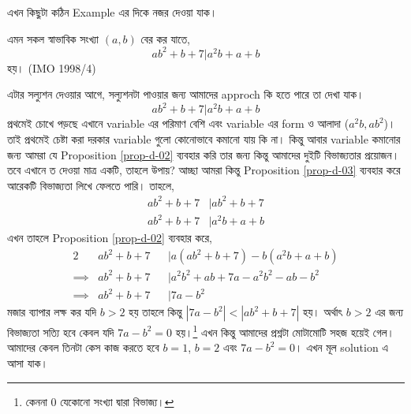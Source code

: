 \documentclass[a4paper,11pt]{article}
\begin{document}
এখন কিছুটা কঠিন Example এর দিকে নজর দেওয়া যাক। 
\begin{xmpl}
	এমন সকল স্বাভাবিক সংখ্যা $(a,b)$ বের কর যাতে,
	\[ab^2+b+7 | a^2b+a+b\]
	হয়। (IMO 1998/4)
\end{xmpl}
এটার সল্যুশন দেওয়ার আগে, সল্যুশনটা পাওয়ার জন্য আমাদের approch কি হতে পারে তা দেখা যাক।
\[ab^2+b+7 | a^2b+a+b\]
প্রথমেই চোখে পড়ছে এখানে variable এর পরিমাণ বেশি এবং variable এর form ও আলাদা ($a^2b, ab^2$)। তাই প্রথমেই চেষ্টা করা দরকার variable গুলো কোনোভাবে কমানো যায় কি না। কিন্তু আবার variable কমানোর জন্য আমরা যে Proposition \ref{prop-d-02} ব্যবহার করি তার জন্য কিন্তু আমাদের দুইটি বিভাজ্যতার প্রয়োজন। তবে এখানে ত দেওয়া মাত্র একটি, তাহলে উপায়? আচ্ছা আমরা কিন্তু Proposition \ref{prop-d-03} ব্যবহার করে আরেকটি বিভাজ্যতা লিখে ফেলতে পারি। তাহলে, 
\begin{align*}
	ab^2+b+7 & \mid ab^2+b+7 \\
	ab^2+b+7 & \mid a^2b+a+b
\end{align*}
এখন তাহলে Proposition \ref{prop-d-02} ব্যবহার করে, 
\begin{alignat*}{2}
	         & ab^2+b+7 &  & \mid a(ab^2+b+7)-b(a^2b+a+b)    \\
	\implies & ab^2+b+7 &  & \mid a^2b^2+ab+7a-a^2b^2-ab-b^2 \\
	\implies & ab^2+b+7 &  & \mid 7a-b^2
\end{alignat*}
মজার ব্যাপার লক্ষ কর যদি $b>2$ হয় তাহলে কিন্তু $|7a-b^2|<|ab^2+b+7|$ হয়। অর্থাৎ $b>2$ এর জন্য বিভাজ্যতা সত্যি হবে কেবল যদি $7a-b^2=0$ হয়।\footnote{কেননা $0$ যেকোনো সংখ্যা দ্বারা বিভাজ্য।} এখন কিন্তু আমাদের প্রশ্নটা মোটামোটি সহজ হয়েই গেল। আমাদের কেবল তিনটা কেস কাজ করতে হবে $b=1$, $b=2$ এবং $7a-b^2=0$। এখন মূল solution এ আসা যাক। 
\end{document}
